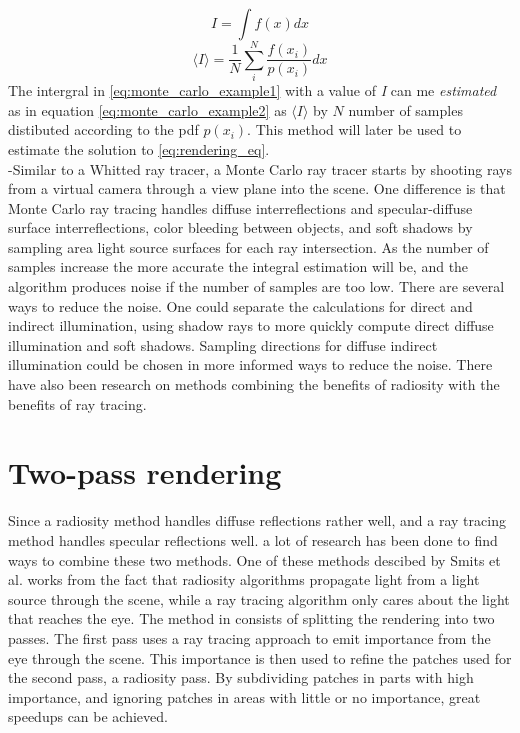 \documentclass[a4paper, 12pt]{report}
\begin{document}
\begin{equation}
 \label{eq:monte_carlo_example1}
 I = \int f(x) dx
 \end{equation}
 \begin{equation}
 \label{eq:monte_carlo_example2}
 \langle I \rangle = \frac{1}{N} \sum^N_i \frac{f(x_i)}{p(x_i)} dx
 \end{equation}
 The intergral in \autoref{eq:monte_carlo_example1} with a value of \emph{I} can me \emph{estimated} as in equation \autoref{eq:monte_carlo_example2} as $\langle I \rangle$ by $N$ number of samples distibuted according to the pdf $p(x_i)$. 
 This method will later be used to estimate the solution to \autoref{eq:rendering_eq}.\\

-Similar to a Whitted ray tracer, a Monte Carlo ray tracer starts by shooting rays from a virtual camera through a view plane into the scene. 
One difference is that Monte Carlo ray tracing handles diffuse interreflections and specular-diffuse surface interreflections, color bleeding between objects, and soft shadows by sampling area light source surfaces for each ray intersection. 
As the number of samples increase the more accurate the integral estimation will be, and the algorithm produces noise if the number of samples are too low. 
There are several ways to reduce the noise. 
One could separate the calculations for direct and indirect illumination, using shadow rays to more quickly compute direct diffuse illumination and soft shadows. 
Sampling directions for diffuse indirect illumination could be chosen in more informed ways to reduce the noise. 
There have also been research on methods combining the benefits of radiosity with the benefits of ray tracing.

\section{Two-pass rendering}
Since a radiosity method handles diffuse reflections rather well, and a ray tracing method handles specular reflections well. a lot of research has been done to find ways to combine these two methods.
One of these methods descibed by Smits et al. \cite{importance_radiosity} works from the fact that radiosity algorithms propagate light from a light source through the scene, while a ray tracing algorithm only cares about the light that reaches the eye.
The method in \cite{importance_radiosity} consists of splitting the rendering into two passes.
The first pass uses a ray tracing approach to emit importance from the eye through the scene.
This importance is then used to refine the patches used for the second pass, a radiosity pass.
By subdividing patches in parts with high importance, and ignoring patches in areas with little or no importance, great speedups can be achieved.
 
\end{document}
